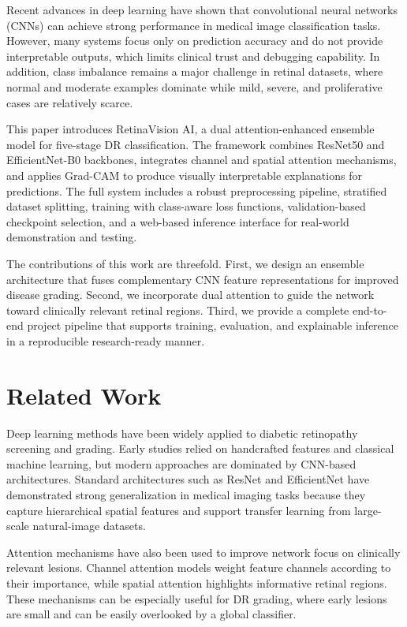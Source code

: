 \documentclass[conference]{IEEEtran}
\begin{document}
Recent advances in deep learning have shown that convolutional neural networks (CNNs) can achieve strong performance in medical image classification tasks. However, many systems focus only on prediction accuracy and do not provide interpretable outputs, which limits clinical trust and debugging capability. In addition, class imbalance remains a major challenge in retinal datasets, where normal and moderate examples dominate while mild, severe, and proliferative cases are relatively scarce.

This paper introduces RetinaVision AI, a dual attention-enhanced ensemble model for five-stage DR classification. The framework combines ResNet50 and EfficientNet-B0 backbones, integrates channel and spatial attention mechanisms, and applies Grad-CAM to produce visually interpretable explanations for predictions. The full system includes a robust preprocessing pipeline, stratified dataset splitting, training with class-aware loss functions, validation-based checkpoint selection, and a web-based inference interface for real-world demonstration and testing.

The contributions of this work are threefold. First, we design an ensemble architecture that fuses complementary CNN feature representations for improved disease grading. Second, we incorporate dual attention to guide the network toward clinically relevant retinal regions. Third, we provide a complete end-to-end project pipeline that supports training, evaluation, and explainable inference in a reproducible research-ready manner.

\section{Related Work}
Deep learning methods have been widely applied to diabetic retinopathy screening and grading. Early studies relied on handcrafted features and classical machine learning, but modern approaches are dominated by CNN-based architectures. Standard architectures such as ResNet and EfficientNet have demonstrated strong generalization in medical imaging tasks because they capture hierarchical spatial features and support transfer learning from large-scale natural-image datasets.

Attention mechanisms have also been used to improve network focus on clinically relevant lesions. Channel attention models weight feature channels according to their importance, while spatial attention highlights informative retinal regions. These mechanisms can be especially useful for DR grading, where early lesions are small and can be easily overlooked by a global classifier.
\end{document}
